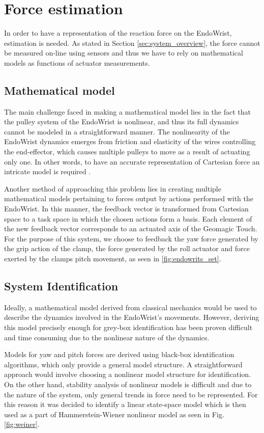 \section{Force estimation}\label{sec:force_estimation}
In order to have a representation of the reaction force on the EndoWrist, estimation is needed.
As stated in Section \ref{sec:system_overview}, the force cannot be measured on-line using sensors and thus we have to rely on mathematical models as functions of actuator measurements.


\subsection{Mathematical model}
The main challenge faced in making a mathematical model lies in the fact that the pulley system of the EndoWrist is nonlinear, and thus its full dynamics cannot be modeled in a straightforward manner. 
The nonlinearity of the EndoWrist dynamics emerges from friction and elasticity of the wires controlling the end-effector, which causes multiple pulleys to move as a result of actuating only one. 
In other words, to have an accurate representation of Cartesian force an intricate model is required  \cite{kim2014dynamic}.

Another method of approaching this problem lies in creating multiple mathematical models pertaining to forces output by actions performed with the EndoWrist.
In this manner, the feedback vector is transformed from Cartesian space to a task space in which the chosen actions form a basis.
Each element of the new feedback vector corresponds to an actuated axis of the Geomagic Touch.
For the purpose of this system, we choose to feedback the yaw force generated by the grip action of the clamp, the force generated by the roll actuator and force exerted by the clamps pitch movement, as seen in \ref{fig:endowrits_set}.

\subsection{System Identification}
Ideally, a mathematical model derived from classical mechanics would be used to describe the dynamics involved in the EndoWrist's movements.
However, deriving this model precisely enough for grey-box identification has been proven difficult and time consuming due to the nonlinear nature of the dynamics.

Models for yaw and pitch forces are derived using black-box identification algorithms, which only provide a general model structure. 
A straightforward approach would involve choosing a nonlinear model structure for identification.
On the other hand, stability analysis of nonlinear models is difficult and due to the nature of the system, only general trends in force need to be represented.
For this reason it was decided to identify a linear state-space model which is then used as a part of Hammerstein-Wiener  \cite{zhu2002estimation} nonlinear model as seen in Fig. \ref{fig:weiner}.


